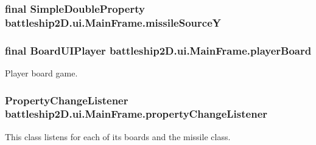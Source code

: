 \hypertarget{classbattleship2D_1_1ui_1_1MainFrame_ac7e5b51abf3de709693d27b0dc0899e7}{
\subsubsection[{missile\-Source\-Y}]{\setlength{\rightskip}{0pt plus 5cm}final Simple\-Double\-Property battleship2\-D.\-ui.\-Main\-Frame.\-missile\-Source\-Y\hspace{0.3cm}{\ttfamily [package]}}}\label{classbattleship2D_1_1ui_1_1MainFrame_ac7e5b51abf3de709693d27b0dc0899e7}
\hypertarget{classbattleship2D_1_1ui_1_1MainFrame_a622caa40f99d1bffb03cf44abf5ee6a0}{
\subsubsection[{player\-Board}]{\setlength{\rightskip}{0pt plus 5cm}final {\bf Board\-U\-I\-Player} battleship2\-D.\-ui.\-Main\-Frame.\-player\-Board\hspace{0.3cm}{\ttfamily [private]}}}\label{classbattleship2D_1_1ui_1_1MainFrame_a622caa40f99d1bffb03cf44abf5ee6a0}


Player board game. 

\hypertarget{classbattleship2D_1_1ui_1_1MainFrame_ac489e5eaa547a158355bcca48e1946ca}{
\subsubsection[{property\-Change\-Listener}]{\setlength{\rightskip}{0pt plus 5cm}Property\-Change\-Listener battleship2\-D.\-ui.\-Main\-Frame.\-property\-Change\-Listener\hspace{0.3cm}{\ttfamily [private]}}}\label{classbattleship2D_1_1ui_1_1MainFrame_ac489e5eaa547a158355bcca48e1946ca}


This class listens for each of its boards and the missile class. 

